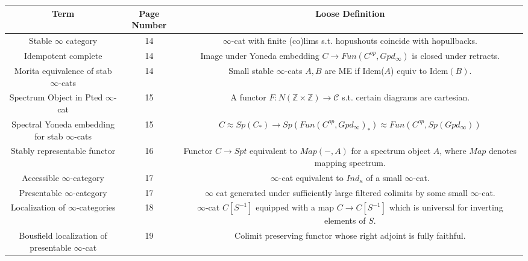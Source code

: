 \documentclass[letterpaper]{article}
\theoremstyle{definition}
\newcommand{\Z}{\mathbb Z}
\newcommand{\mc}{\mathcal}
\begin{document}
\begin{tabulary}{0.7 \textwidth}{|C|C|C|}
\hline
Term & Page Number & Loose Definition\\
\hline
\hline
Stable $\infty$ category & 14 & $\infty$-cat with finite (co)lims
                                s.t. hopushouts coincide with hopullbacks.\\
\hline
Idempotent complete & 14 & Image under Yoneda
                           embedding $C \rightarrow Fun(C^{op},Gpd_\infty)$ is closed under retracts.\\
\hline
Morita equivalence of stab $\infty$-cats& 14& Small stable
                                              $\infty$-cats $A,B$ are
                                              ME if Idem($A$) equiv to
  Idem$(B)$.\\
\hline
Spectrum Object in Pted $\infty$-cat & 15& A functor $F : N(\Z \times
                                           \Z) \rightarrow \mc C$
                                           s.t. certain diagrams are cartesian.\\
\hline
Spectral Yoneda embedding for stab $\infty$-cats & 15 & $C \approx
                                                        Sp(C_*)
                                                        \rightarrow
                                                        Sp(Fun(C^{op},Gpd_{\infty})_*)
  \approx Fun(C^{op},Sp(Gpd_{\infty}))$\\
\hline
Stably representable functor & 16 & Functor $C \rightarrow Spt$ equivalent to $Map(-,A)$
                                    for a spectrum object $A$, where
                                    $Map$ denotes mapping spectrum.\\
\hline
Accessible $\infty$-category & 17 & $\infty$-cat equivalent to $Ind_\kappa$ of
                                    a small $\infty$-cat.\\
\hline
Presentable $\infty$-category & 17 & $\infty$ cat generated under
                                     sufficiently large filtered
                                     colimits by some small $\infty$-cat.\\
\hline
Localization of $\infty$-categories & 18 & $\infty$-cat $C[S^{-1}]$
                                           equipped with a map $C
                                           \rightarrow C[S^{-1}]$
                                           which is universal for
                                           inverting elements of $S$.\\
\hline
Bousfield localization of presentable $\infty$-cat & 19 & Colimit
                                                          preserving
                                                          functor
                                                          whose right
                                                          adjoint is
                                                          fully faithful.\\
\hline
\end{tabulary}
\end{document}
